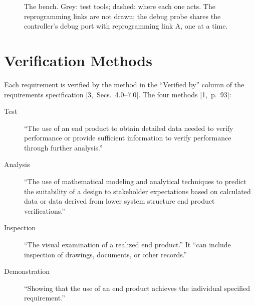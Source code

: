 \documentclass[11pt,a4paper]{article}
\newcommand{\nohyph}{\hyphenpenalty=10000\exhyphenpenalty=10000\relax}
\begin{document}
\begin{figure}[H]
\centering
{}
\caption{The bench. Grey: test tools; dashed: where each one acts. The
reprogramming links are not drawn; the debug probe shares the controller's
debug port with reprogramming link A, one at a time.}
\label{fig:setup}
\end{figure}

\section{Verification Methods}
Each requirement is verified by the method in the ``Verified by'' column of
the requirements specification [3,~Secs.~4.0--7.0]. The four methods [1,~p.~93]:

\begin{description}
\item[Test] ``The use of an end product to obtain detailed data needed to
  verify performance or provide sufficient information to verify performance
  through further analysis.''
\item[Analysis] ``The use of mathematical modeling and analytical techniques
  to predict the suitability of a design to stakeholder expectations based on
  calculated data or data derived from lower system structure end product
  verifications.''
\item[Inspection] ``The visual examination of a realized end product.''
  It ``can include inspection of drawings, documents, or other records.''
\item[Demonstration] ``Showing that the use of an end product achieves the
  individual specified requirement.''
\end{description}
\end{document}

